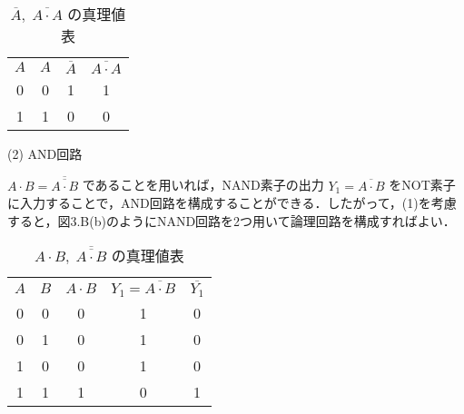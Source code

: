 \begin{table}[!h]
    \caption{$\overline{A},\;\overline{A \cdot A}$ の真理値表}
    \label{tbl01}
    \begin{center}
        \begin{tabular}{|c|c||c|c|}
            \hline
            $A$ & $A$ & $\overline{A}$ & $\overline{A \cdot A}$ \\
            \hhline{|=|=#=|=|}
            0   & 0   & 1              & 1                      \\
            \hline
            1   & 1   & 0              & 0                      \\
            \hline
        \end{tabular}
    \end{center}
\end{table}

\vspace{7mm}
\noindent
(2) AND回路 \vspace{2mm}

$A \cdot B = \overline{\overline{A \cdot B}}$ であることを用いれば，NAND素子の出力 $Y_1 = \overline{A \cdot B}$ をNOT素子に入力することで，AND回路を構成することができる．したがって，(1)を考慮すると，図3.B(b)のようにNAND回路を2つ用いて論理回路を構成すればよい．

\begin{table}[!h]
    \caption{$A \cdot B,\; \overline{\overline{A \cdot B}}$ の真理値表}
    \label{tbl02}
    \begin{center}
        \begin{tabular}{|c|c||c|c|c|}
            \hline
            $A$ & $B$ & $A \cdot B$ & $Y_1 = \overline{A \cdot B}$ & $\overline{Y_1}$ \\
            \hhline{|=|=#=|=|=|}
            0   & 0   & 0           & 1                            & 0                \\
            \hline
            0   & 1   & 0           & 1                            & 0                \\
            \hline
            1   & 0   & 0           & 1                            & 0                \\
            \hline
            1   & 1   & 1           & 0                            & 1                \\
            \hline
        \end{tabular}
    \end{center}
\end{table}

